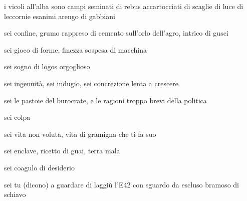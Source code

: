 \begin{poem}
	\begin{stanza}
		i vicoli all'alba\verseline
		sono campi seminati\verseline
		di rebus accartocciati\verseline
		di scaglie di luce\verseline
		di leccornie esanimi\verseline
		arengo di gabbiani
	\end{stanza}
\end{poem}

\clearpage


\begin{poem}
	\begin{stanza}
		sei confine, grumo rappreso di cemento\verseline
		sull'orlo dell'agro, intrico di gusci
	\end{stanza}

	\begin{stanza}
		sei gioco di forme, finezza sospesa\verseline
		di macchina
	\end{stanza}

	\begin{stanza}
		sei sogno di logos orgoglioso
	\end{stanza}

	\begin{stanza}
		sei ingenuità, sei indugio, sei concrezione
		lenta a crescere
	\end{stanza}

	\begin{stanza}
		sei le pastoie del burocrate, e le ragioni\verseline
		troppo brevi della politica
	\end{stanza}

	\begin{stanza}
		sei colpa
	\end{stanza}

	\begin{stanza}
		sei vita non voluta, vita di gramigna\verseline
		che ti fa suo
	\end{stanza}

	\begin{stanza}
		sei enclave, ricetto di guai, terra mala
	\end{stanza}

	\begin{stanza}
		sei coagulo di desiderio
	\end{stanza}

	\begin{stanza}
		sei tu (dicono) a guardare di laggiù\verseline
		l’E42\verseline
		con sguardo da escluso\verseline
		bramoso\verseline
		di schiavo
	\end{stanza}
\end{poem}

